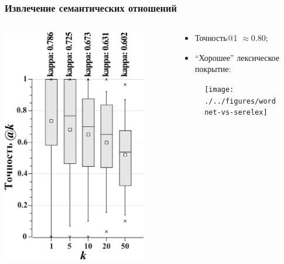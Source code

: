\documentclass{beamer}
\begin{document}
\begin{frame}
\frametitle{Извлечение семантических отношений}
  \begin{columns}[T]
    \begin{column}{.4\textwidth}
     
\includegraphics[width=0.85\textwidth]{./kappa}
    
    \end{column}
    \begin{column}{.6\textwidth}
\begin{itemize}
  \item Точность@1 $\approx 0.80$;
  \item ``Хорошее'' лексическое покрытие:
  
\end{itemize}

\begin{figure}
\texttt{[image: ./../figures/wordnet-vs-serelex]}
\end{figure}
      
    \end{column}
  \end{columns}
\end{frame}
\end{document}
